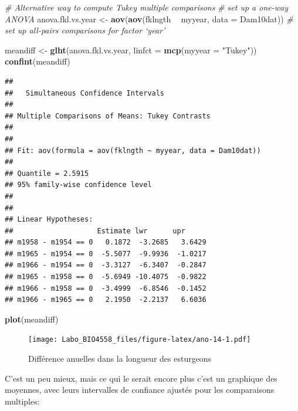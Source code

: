 \documentclass[12pt,]{book}
\newenvironment{Shaded}{\begin{snugshade}}{\end{snugshade}}
\newcommand{\CommentTok}[1]{\textcolor[rgb]{0.56,0.35,0.01}{\textit{#1}}}
\newcommand{\DataTypeTok}[1]{\textcolor[rgb]{0.13,0.29,0.53}{#1}}
\newcommand{\KeywordTok}[1]{\textcolor[rgb]{0.13,0.29,0.53}{\textbf{#1}}}
\newcommand{\NormalTok}[1]{#1}
\newcommand{\OperatorTok}[1]{\textcolor[rgb]{0.81,0.36,0.00}{\textbf{#1}}}
\newcommand{\StringTok}[1]{\textcolor[rgb]{0.31,0.60,0.02}{#1}}
\begin{document}
\begin{Shaded}
\begin{Highlighting}[]
\CommentTok{# Alternative way to compute Tukey multiple comparisons}
\CommentTok{# set up a one-way ANOVA}
\NormalTok{anova.fkl.vs.year <-}\StringTok{ }\KeywordTok{aov}\NormalTok{(}\KeywordTok{aov}\NormalTok{(fklngth }\OperatorTok{~}\StringTok{ }\NormalTok{myyear, }\DataTypeTok{data =}\NormalTok{ Dam10dat))}
\CommentTok{# set up all-pairs comparisons for factor `year'}

\NormalTok{meandiff <-}\StringTok{ }\KeywordTok{glht}\NormalTok{(anova.fkl.vs.year, }\DataTypeTok{linfct =} \KeywordTok{mcp}\NormalTok{(}\DataTypeTok{myyear =}
\StringTok{"Tukey"}\NormalTok{))}
\KeywordTok{confint}\NormalTok{(meandiff)}
\end{Highlighting}
\end{Shaded}

\begin{verbatim}
## 
##   Simultaneous Confidence Intervals
## 
## Multiple Comparisons of Means: Tukey Contrasts
## 
## 
## Fit: aov(formula = aov(fklngth ~ myyear, data = Dam10dat))
## 
## Quantile = 2.5915
## 95% family-wise confidence level
##  
## 
## Linear Hypotheses:
##                    Estimate lwr      upr     
## m1958 - m1954 == 0   0.1872  -3.2685   3.6429
## m1965 - m1954 == 0  -5.5077  -9.9936  -1.0217
## m1966 - m1954 == 0  -3.3127  -6.3407  -0.2847
## m1965 - m1958 == 0  -5.6949 -10.4075  -0.9822
## m1966 - m1958 == 0  -3.4999  -6.8546  -0.1452
## m1966 - m1965 == 0   2.1950  -2.2137   6.6036
\end{verbatim}

\begin{Shaded}
\begin{Highlighting}[]
\KeywordTok{plot}\NormalTok{(meandiff)}
\end{Highlighting}
\end{Shaded}

\begin{figure}
\centering
\texttt{[image: Labo\_BIO4558\_files/figure-latex/ano-14-1.pdf]}
\caption{\label{fig:ano-14}Différence anuelles dans la longueur des esturgeons}
\end{figure}

C'est un peu mieux, mais ce qui le serait encore plus c'est un graphique des moyennes, avec leurs intervalles de confiance ajustés pour les comparaisons multiples:
\end{document}
